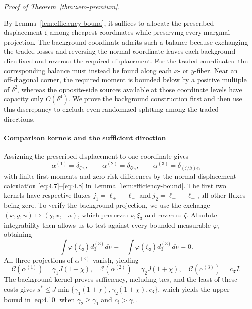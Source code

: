 \textit{Proof of Theorem~\ref{thm:zero-premium}.}

By Lemma~\ref{lem:efficiency-bound}, it suffices to allocate the prescribed displacement \(\zeta\) among cheapest coordinates while preserving every marginal projection. The background coordinate admits such a balance because exchanging the traded losses and reversing the normal coordinate leaves each background slice fixed and reverses the required displacement. For the traded coordinates, the corresponding balance must instead be found along each \(x\)- or \(y\)-fiber. Near an off-diagonal corner, the required moment is bounded below by a positive multiple of \(\delta^2\), whereas the opposite-side sources available at those coordinate levels have capacity only \(O(\delta^4)\). We prove the background construction first and then use this discrepancy to exclude even randomized splitting among the traded directions.

\paragraph{Comparison kernels and the sufficient direction}\label{par:comparison-kernels}
Assigning the prescribed displacement to one coordinate gives
\begin{equation}
\alpha^{(1)}=\delta_{\zeta e_1},\qquad
\alpha^{(2)}=\delta_{\zeta e_2},\qquad
\alpha^{(3)}=\delta_{(\zeta/\beta)e_3}
\tag{4.11}\label{eq:4.11}
\end{equation}
with finite first moments and zero risk differences by the normal-displacement calculation \eqref{eq:4.7}--\eqref{eq:4.8} in Lemma~\ref{lem:efficiency-bound}. The first two kernels have respective fluxes \(j_1=\ell_+-\ell_-\) and \(j_2=\ell_--\ell_+\), all other fluxes being zero. To verify the background projection, we use the exchange \((x,y,u)\mapsto(y,x,-u)\), which preserves \(\nu,\xi_3\) and reverses \(\zeta\). Absolute integrability then allows us to test against every bounded measurable \(\varphi\), obtaining
\begin{equation}
\int\varphi(\xi_3)d_3^{(3)}d\nu
=-\int\varphi(\xi_3)d_3^{(3)}d\nu=0.
\tag{4.12}\label{eq:4.12}
\end{equation}
All three projections of \(\alpha^{(3)}\) vanish, yielding
\begin{equation}
\mathcal C(\alpha^{(1)})=\gamma_1J(1+\chi),\quad
\mathcal C(\alpha^{(2)})=\gamma_2J(1+\chi),\quad
\mathcal C(\alpha^{(3)})=c_3J.
\tag{4.13}\label{eq:4.13}
\end{equation}
The background kernel proves sufficiency, including ties, and the least of these costs gives \(s^*\le J\min\{\gamma_1(1+\chi),\gamma_2(1+\chi),c_3\}\), which yields the upper bound in \eqref{eq:4.10} when \(\gamma_2\ge\gamma_1\) and \(c_3>\gamma_1\).

